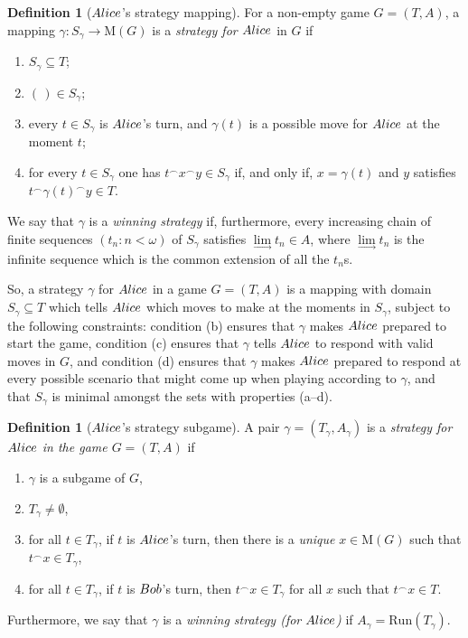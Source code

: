 \documentclass[12pt]{amsart}
\theoremstyle{definition}
\newtheorem{defn}[thm]{Definition}
\newcommand{\seq}[1]{{\left( {#1} \right)}}
\newcommand{\ali}{\textup{\textmd{\textsc{Alice}}}}
\newcommand{\bob}{\textup{\textmd{\textsc{Bob}}}}
\newcommand{\Run}{{\mathrm{Run}}}
\newcommand{\M}{\mathrm{M}}
\begin{document}
\begin{defn}[$\ali$'s strategy mapping]\label{DEF_AStratMap}
	For a non-empty game $G = (T,A)$, a mapping $\gamma\colon S_\gamma\to \M(G)$ is a \textit{strategy for $\ali$} in $G$ if
	\begin{enumerate}
		\item[(a)] $S_\gamma\subseteq T$;
		\item[(b)] $\seq{\,}\in S_\gamma$;
		\item[(c)] every $t\in S_\gamma$ is $\ali$'s turn, and $\gamma(t)$ is a possible move for $\ali$ at the moment $t$;
		\item[(d)] for every $t\in S_\gamma$ one has $t^\smallfrown x^\smallfrown y\in S_\gamma$ if, and only if, $x=\gamma(t)$ and $y$ satisfies  $t^\smallfrown \gamma(t)^\smallfrown y\in T$.
	\end{enumerate} 
	We say that $\gamma$ is a \textit{winning strategy} if, furthermore, every increasing chain of finite sequences $\left(t_n:n<\omega\right)$ of $S_\gamma$
	satisfies $\lim\limits_{\longrightarrow} t_n\in A$, where $\lim\limits_{\longrightarrow} t_n$ is the infinite sequence which is the common extension of all the $t_n$s.
\end{defn}


So, a strategy $\gamma$ for $\ali$ in a game $G=(T,A)$ is a mapping with domain $S_\gamma\subseteq T$ which tells $\ali$ which moves to make at the moments in $S_\gamma$, subject to the following constraints: condition (b) ensures that $\gamma$ makes $\ali$ prepared to start the game, condition (c) ensures that $\gamma$ tells $\ali$ to respond with valid moves in $G$, and condition (d) ensures that $\gamma$ makes $\ali$ prepared to respond at every possible scenario that might come up when playing according to $\gamma$, and that $S_\gamma$ is minimal amongst the sets with properties (a--d). 


\begin{defn}[$\ali$'s strategy subgame]\label{DEF_AStrat}
	A pair $\gamma = (T_\gamma, A_\gamma)$ is a \textit{strategy for $\ali$ in the game $G=(T,A)$} if 
	\begin{enumerate}
		\item[(a)] $\gamma$ is a subgame of $G$,
		\item [(b)] $T_\gamma\neq \emptyset$,
		\item[(c)] for all $t\in T_\gamma$, if $t$ is $\ali$'s turn, then there is a \textit{unique} $x\in \M(G)$ such that $t^\smallfrown x\in T_\gamma$,
		\item[(d)] for all $t\in T_\gamma$, if $t$ is $\bob$'s turn, then $t^\smallfrown x\in T_\gamma$ for all $x$ such that $t^\smallfrown x \in T$.
	\end{enumerate} 
	Furthermore, we say that $\gamma$ is a \textit{winning strategy (for $\ali$)} if $A_\gamma = \Run(T_\gamma)$.
\end{defn}
\end{document}
